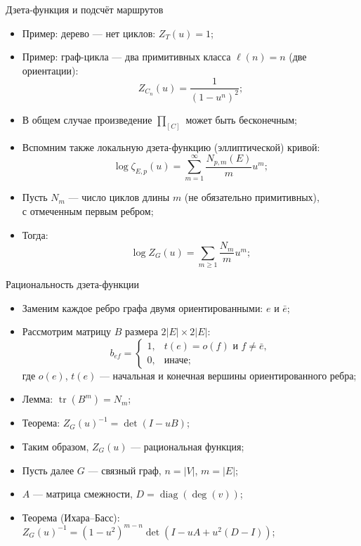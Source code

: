 \documentclass[serif, aspectratio=169]{beamer}
\begin{document}
\begin{frame}{Дзета-функция и подсчёт маршрутов}
    \begin{itemize}
        \item Пример: дерево --- нет циклов: $Z_T(u)=1$;
        \item Пример: граф-цикла --- два примитивных класса $\ell(n)=n$ (две ориентации):
        \[Z_{C_n}(u)=\frac{1}{(1-u^n)^2};\]
        \item В общем случае произведение $\prod_{[C]}$ может быть бесконечным;
        \item Вспомним также локальную дзета-функцию (эллиптической) кривой:
        \[\log \zeta_{E,p}(u) = \sum_{m=1}^\infty \frac{N_{p,m}(E)}{m} u^m;\]
        \item Пусть $N_m$ --- число циклов длины $m$ (не обязательно примитивных),\\ с отмеченным первым ребром;
        \item Тогда:
        \[\log Z_G(u)=\sum_{m\ge1}\frac{N_m}{m}u^m;\]
    \end{itemize}
    \note{
        \begin{itemize}
            \item ---
        \end{itemize}
    }
\end{frame}

\begin{frame}{Рациональность дзета-функции}
    \begin{itemize}
        \item Заменим каждое ребро графа двумя ориентированными: $e$ и $\bar e$;
        \item Рассмотрим матрицу $B$ размера $2|E|\times2|E|$:
        \[b_{ef}=\begin{cases}1,&t(e)=o(f)\text{ и }f\ne\bar e,\\0,&\text{иначе};\end{cases}\]
        где $o(e)$, $t(e)$ --- начальная и конечная вершины ориентированного ребра;
        \item Лемма: $\operatorname{tr}(B^m)=N_m$;
        \item Теорема: $Z_G(u)^{-1}=\det(I-uB)$;
        \item Таким образом, $Z_G(u)$ --- рациональная функция;
        \item Пусть далее $G$ --- связный граф, $n=|V|$, $m=|E|$;
        \item $A$ --- матрица смежности, $D=\operatorname{diag}(\deg(v))$;
        \item Теорема (Ихара--Басс): $Z_G(u)^{-1}=(1-u^2)^{m-n}\det\left(I-uA+u^2(D-I)\right)$;
    \end{itemize}
    \note{
        \begin{itemize}
            \item ---
        \end{itemize}
    }
\end{frame}
\end{document}
